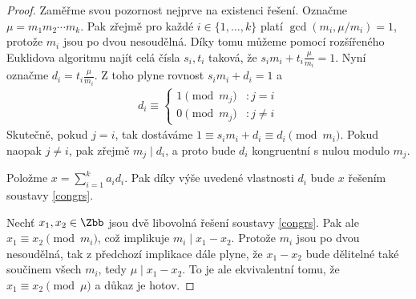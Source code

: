\begin{proof}
Zaměřme svou pozornost nejprve na existenci řešení. Označme
$ \mu = m_1 m_2 \cdots m_k $. Pak zřejmě pro každé $ i \in \{1,\dots,k\} $
platí $ \gcd(m_i, \mu / m_i) = 1 $, protože $ m_i $ jsou po dvou nesoudělná.
Díky tomu můžeme pomocí rozšířeného Euklidova algoritmu najít celá čísla
$ s_i, t_i $ taková, že $ s_i m_i + t_i \frac{\mu}{m_i} = 1 $. Nyní označme
$ d_i = t_i \frac{\mu}{m_i} $. Z toho plyne rovnost $ s_i m_i + d_i = 1 $ a
\begin{align*}
d_i \equiv
\left\{
  \begin{array}{lr}
    1 \pmod{ m_j } & : j = i \\
    0 \pmod{ m_j }  & : j \neq i
  \end{array}
\right.
\end{align*}
Skutečně, pokud $ j = i $, tak dostáváme
$ 1 \equiv s_i m_i + d_i \equiv d_i \pmod{m_i} $. Pokud naopak $ j \neq i $, pak
zřejmě $ m_j \mid d_i $, a proto bude $ d_i $ kongruentní s nulou modulo $ m_j $.

Položme $ x = \sum\limits_{i = 1}^{k} a_i d_i $. Pak díky výše uvedené
vlastnosti $ d_i $ bude $ x $ řešením soustavy \eqref{congrs}.

Nechť $ x_1, x_2 \in \Zbb $ jsou dvě libovolná řešení soustavy \eqref{congrs}.
Pak ale $ x_1 \equiv x_2 \pmod{m_i} $, což implikuje $ m_i \mid x_1 - x_2 $.
Protože $ m_i $ jsou po dvou nesoudělná, tak z předchozí implikace dále plyne, že
$ x_1 - x_2 $ bude dělitelné také součinem všech $ m_i $, tedy
$ \mu \mid x_1 - x_2 $. To je ale ekvivalentní tomu, že
$ x_1 \equiv x_2 \pmod{\mu} $ a důkaz je hotov.
\end{proof}

